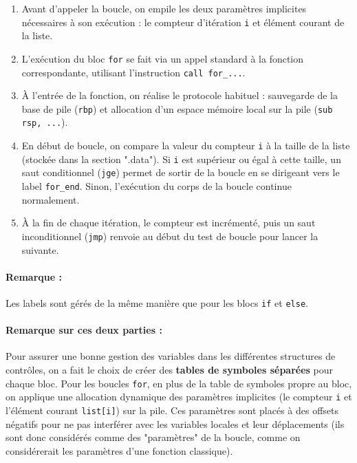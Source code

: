 \documentclass[a4paper, 12pt]{report}
\begin{document}
\begin{enumerate}
	\item Avant d'appeler la boucle, on empile les deux paramètres implicites nécessaires à son exécution : le compteur d'itération \texttt{i} et élément courant de la liste.

	\item L'exécution du bloc \texttt{for} se fait via un appel standard à la fonction correspondante, utilisant l'instruction \texttt{call for\_...}.
	\item À l'entrée de la fonction, on réalise le protocole habituel : sauvegarde de la base de pile (\texttt{rbp}) et allocation d'un espace mémoire local sur la pile (\texttt{sub rsp, ...}).
	\item En début de boucle, on compare la valeur du compteur \texttt{i} à la taille de la liste (stockée dans la section ".data"). Si \texttt{i} est supérieur ou égal à cette taille, un saut conditionnel (\texttt{jge}) permet de sortir de la boucle en se dirigeant vers le label \texttt{for\_end}. Sinon, l'exécution du corps de la boucle continue normalement.
	\item À la fin de chaque itération, le compteur est incrémenté, puis un saut inconditionnel (\texttt{jmp}) renvoie au début du test de boucle pour lancer la suivante.\\
\end{enumerate}

\paragraph*{Remarque :} Les labels sont gérés de la même manière que pour les blocs \texttt{if} et \texttt{else}.\\

\paragraph*{Remarque sur ces deux parties :} Pour assurer une bonne gestion des variables dans les différentes structures de contrôles, on a fait le choix de créer des \textbf{tables de symboles séparées} pour chaque bloc. Pour les boucles \texttt{for}, en plus de la table de symboles propre au bloc, on applique une allocation dynamique des paramètres implicites (le compteur \texttt{i} et l'élément courant \texttt{list[i]}) sur la pile. Ces paramètres sont placés à des offsets négatifs pour ne pas interférer avec les variables locales et leur déplacements (ils sont donc considérés comme des "paramètres" de la boucle, comme on considérerait les paramètres d'une fonction classique).\\
\end{document}

